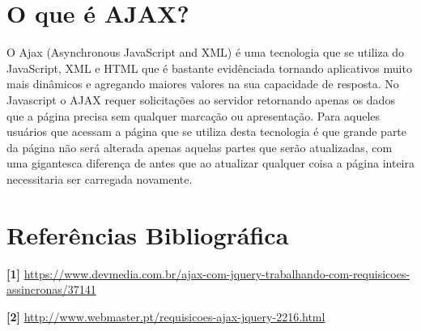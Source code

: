 \documentclass[12pt,a4paper]{article}
\begin{document}
\section{O que é AJAX?}
O Ajax (Asynchronous JavaScript and XML) é uma tecnologia que se utiliza do JavaScript, XML e HTML que é bastante evidênciada tornando aplicativos muito mais dinâmicos e agregando maiores valores na sua capacidade de resposta.
No Javascript o AJAX requer solicitações ao servidor retornando apenas os dados que a página precisa sem qualquer marcação ou apresentação. Para aqueles usuários que acessam a página que se utiliza desta tecnologia é que grande parte da página não será alterada apenas aquelas partes que serão atualizadas, com uma gigantesca diferença de antes que ao atualizar qualquer coisa a página inteira necessitaria ser carregada novamente.

\section{Referências Bibliográfica}
\noindent \textbf{[1]} \url {https://www.devmedia.com.br/ajax-com-jquery-trabalhando-com-requisicoes-assincronas/37141}
\\\vspace{0.2cm}

\noindent \textbf{[2]} \url {http://www.webmaster.pt/requisicoes-ajax-jquery-2216.html}
\end{document}

